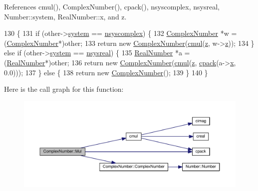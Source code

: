 References cmul(), Complex\+Number(), cpack(), nsyscomplex, nsysreal, Number\+::system, Real\+Number\+::x, and z.


\begin{DoxyCode}
130 \{
131     \textcolor{keywordflow}{if} (other->\hyperlink{structNumber_a2ceda5601c42288626e76b06878e7476}{system} == \hyperlink{numb_8h_a1475a201d2346881ce88dfbacf628c7da3b38c947375a3db3a4bc184a11c8ee42}{nsyscomplex}) \{
132         \hyperlink{structComplexNumber}{ComplexNumber} *w = (\hyperlink{structComplexNumber}{ComplexNumber}*)other;
133         \textcolor{keywordflow}{return} \textcolor{keyword}{new} \hyperlink{structComplexNumber_a610e9db9ff0ddb0140e30d235ab64e44}{ComplexNumber}(\hyperlink{complex_8h_a340ad83d03bcc727538d25dcf6dd26e9}{cmul}(\hyperlink{structComplexNumber_a5f72da71f4ce0d88076a391369239042}{z}, w->\hyperlink{structComplexNumber_a5f72da71f4ce0d88076a391369239042}{z}));
134     \} \textcolor{keywordflow}{else}  \textcolor{keywordflow}{if} (other->\hyperlink{structNumber_a2ceda5601c42288626e76b06878e7476}{system} == \hyperlink{numb_8h_a1475a201d2346881ce88dfbacf628c7dae72cf8673109b15268d1c0837e8bff86}{nsysreal}) \{
135         \hyperlink{structRealNumber}{RealNumber} *a = (\hyperlink{structRealNumber}{RealNumber}*)other;
136         \textcolor{keywordflow}{return} \textcolor{keyword}{new} \hyperlink{structComplexNumber_a610e9db9ff0ddb0140e30d235ab64e44}{ComplexNumber}(\hyperlink{complex_8h_a340ad83d03bcc727538d25dcf6dd26e9}{cmul}(\hyperlink{structComplexNumber_a5f72da71f4ce0d88076a391369239042}{z}, \hyperlink{complex_8h_a980e6e049f7902b05fc9eb5614b07a5c}{cpack}(a->\hyperlink{structRealNumber_ac33d80bee75448490199a0aa48ccce1e}{x}, 0.0)));
137     \} \textcolor{keywordflow}{else} \{
138         \textcolor{keywordflow}{return} \textcolor{keyword}{new} \hyperlink{structComplexNumber_a610e9db9ff0ddb0140e30d235ab64e44}{ComplexNumber}();
139     \}
140 \}
\end{DoxyCode}


Here is the call graph for this function\+:
\nopagebreak
\begin{figure}[H]
\begin{center}
\leavevmode
\includegraphics[width=350pt]{db/d8e/structComplexNumber_a8b876b0e7e776fa2f0fa2bc034cc224b_cgraph}
\end{center}
\end{figure}


